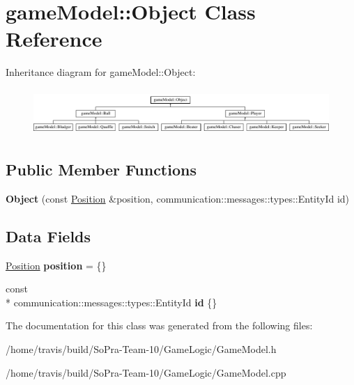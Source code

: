 \hypertarget{classgame_model_1_1_object}{\section{game\-Model\-:\-:Object Class Reference}
\label{classgame_model_1_1_object}
}
Inheritance diagram for game\-Model\-:\-:Object\-:\begin{figure}[H]
\begin{center}
\leavevmode
\includegraphics[height=1.777778cm]{classgame_model_1_1_object}
\end{center}
\end{figure}
\subsection*{Public Member Functions}
\begin{DoxyCompactItemize}
\item 
\hypertarget{classgame_model_1_1_object_a22ec074a1b4f4c3b90e0827b07939f10}{{\bfseries Object} (const \hyperlink{structgame_model_1_1_position}{Position} \&position, communication\-::messages\-::types\-::\-Entity\-Id id)}\label{classgame_model_1_1_object_a22ec074a1b4f4c3b90e0827b07939f10}

\end{DoxyCompactItemize}
\subsection*{Data Fields}
\begin{DoxyCompactItemize}
\item 
\hypertarget{classgame_model_1_1_object_a852c8ff1e230a07349aa8dc60b8cbd71}{\hyperlink{structgame_model_1_1_position}{Position} {\bfseries position} = \{\}}\label{classgame_model_1_1_object_a852c8ff1e230a07349aa8dc60b8cbd71}

\item 
\hypertarget{classgame_model_1_1_object_ada26da82f66b6139d4a430962ebbef22}{const \\*
communication\-::messages\-::types\-::\-Entity\-Id {\bfseries id} \{\}}\label{classgame_model_1_1_object_ada26da82f66b6139d4a430962ebbef22}

\end{DoxyCompactItemize}


The documentation for this class was generated from the following files\-:\begin{DoxyCompactItemize}
\item 
/home/travis/build/\-So\-Pra-\/\-Team-\/10/\-Game\-Logic/Game\-Model.\-h\item 
/home/travis/build/\-So\-Pra-\/\-Team-\/10/\-Game\-Logic/Game\-Model.\-cpp\end{DoxyCompactItemize}
